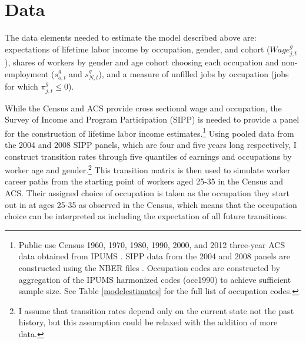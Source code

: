 \documentclass[12pt]{article}
\begin{document}
\section{Data} \label{data}
The data elements needed to estimate the model described above are: expectations of lifetime labor income by occupation, gender, and cohort ($Wage^g_{j,t}$), shares of workers by gender and age cohort choosing each occupation and non-employment ($s^g_{o,t}$ and $s^g_{N,t}$), and a measure of unfilled jobs by occupation (jobs for which $\pi^g_{j,t} \leq 0$).

While the Census and ACS provide cross sectional wage and occupation, the Survey of Income and Program Participation (SIPP) is needed to provide a panel for the construction of lifetime labor income estimates.\footnote{Public use Census 1960, 1970, 1980, 1990, 2000, and 2012 three-year ACS data obtained from IPUMS \cite{IPUMSUSA}. SIPP data from the 2004 and 2008 panels are constructed using the NBER files \cite{SIPP}. Occupation codes are constructed by aggregation of the IPUMS harmonized codes (occ1990) to achieve sufficient sample size. See Table \ref{modelestimates} for the full list of occupation codes.} Using pooled data from the 2004 and 2008 SIPP panels, which are four and five years long respectively, I construct transition rates through five quantiles of earnings and occupations by worker age and gender.\footnote{ I assume that transition rates depend only on the current state not the past history, but this assumption could be relaxed with the addition of more data.} This transition matrix is then used to simulate worker career paths from the starting point of workers aged 25-35 in the Census and ACS. Their assigned choice of occupation is taken as the occupation they start out in at ages 25-35 as observed in the Census, which means that the occupation choice can be interpreted as including the expectation of all future transitions.



\end{document}
